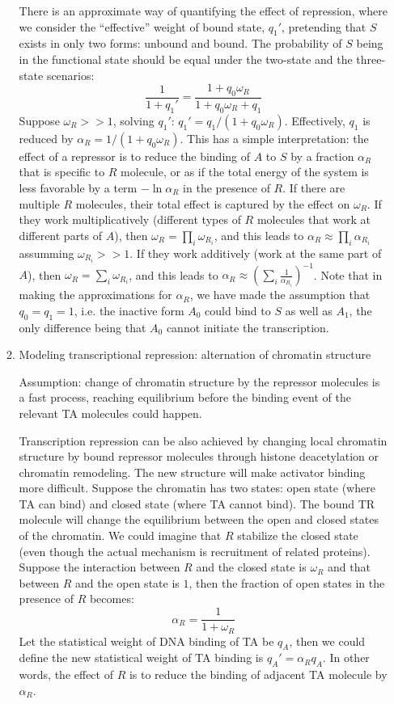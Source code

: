 \documentclass[11pt]{article}
\begin{document}
\begin{enumerate}
\begin{enumerate}
There is an approximate way of quantifying the effect of repression, where we consider the ``effective'' weight of bound state, $q_1'$, pretending that $S$ exists in only two forms: unbound and bound. The probability of $S$ being in the functional state should be equal under the two-state and the three-state scenarios:
\begin{equation}
\frac{1}{1 + q_1'} = \frac{1 + q_0 \omega_R}{1 + q_0 \omega_R + q_1}
\end{equation} 
Suppose $\omega_R >> 1$, solving $q_1'$: $q_1' = q_1/(1 + q_0 \omega_R)$. Effectively, $q_1$ is reduced by $\alpha_R = 1/(1 + q_0 \omega_R)$. This has a simple interpretation: the effect of a repressor is to reduce the binding of $A$ to $S$ by a fraction $\alpha_R$ that is specific to $R$ molecule, or as if the total energy of the system is less favorable by a term $-\ln \alpha_R$ in the presence of $R$. If there are multiple $R$ molecules, their total effect is captured by the effect on $\omega_R$. If they work multiplicatively (different types of $R$ molecules that work at different parts of $A$), then $\omega_R = \prod_{i}\omega_{R_i}$, and this leads to $\alpha_R \approx \prod_i{\alpha_{R_i}}$ assumming $\omega_{R_i} >> 1$. If they work additively (work at the same part of $A$), then $\omega_R = \sum_{i}{\omega_{R_i}}$, and this leads to $\alpha_R \approx (\sum_i{\frac{1}{\alpha_{R_i}}})^{-1}$. Note that in making the approximations for $\alpha_R$, we have made the assumption that $q_0 = q_1 = 1$, i.e. the inactive form $A_0$ could bind to $S$ as well as $A_1$, the only difference being that $A_0$ cannot initiate the transcription. 

\item{Modeling transcriptional repression: alternation of chromatin structure}

Assumption: change of chromatin structure by the repressor molecules is a fast process, reaching equilibrium before the binding event of the relevant TA molecules could happen. 

Transcription repression can be also achieved by changing local chromatin structure by bound repressor molecules through histone deacetylation or chromatin remodeling. The new structure will make activator binding more difficult. Suppose the chromatin has two states: open state (where TA can bind) and closed state (where TA cannot bind). The bound TR molecule will change the equilibrium between the open and closed states of the chromatin. We could imagine that $R$ stabilize the closed state (even though the actual mechanism is recruitment of related proteins). Suppose the interaction between $R$ and the closed state is $\omega_R$ and that between $R$ and the open state is $1$, then the fraction of open states in the presence of $R$ becomes:
\begin{equation}
\alpha_R = \frac{1}{1 + \omega_R}
\end{equation}
Let the statistical weight of DNA binding of TA be $q_A$, then we could define the new statistical weight of TA binding is $q_A' = \alpha_R q_A$. In other words, the effect of $R$ is to reduce the binding of adjacent TA molecule by $\alpha_R$. 


\end{enumerate}
\end{enumerate}
\end{document}

